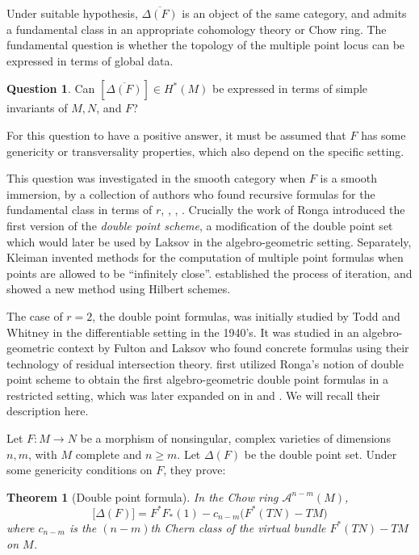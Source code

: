 \documentclass[11pt]{article}
\theoremstyle{plain}
\newtheorem{theorem}[fact]{Theorem}
\theoremstyle{definition}
\newtheorem*{question*}{Question}
\theoremstyle{definition}
\begin{document}
Under suitable hypothesis, $\overline{\Delta(F)}$ is an object of the same category, and admits a fundamental class in an appropriate cohomology theory or Chow ring. The fundamental question is whether the topology of the multiple point locus can be expressed in terms of global data.

\begin{question*}
    Can $\left[\overline{\Delta(F)}\right]\in H^*(M)$ be expressed in terms of simple invariants of $M,N$, and $F$? 
\end{question*}

For this question to have a positive answer, it must be assumed that $F$ has some genericity or transversality properties, which also depend on the specific setting. 

This question was investigated in the smooth category when $F$ is a smooth immersion, by a collection of authors who found recursive formulas for the fundamental class in terms of $r$, \cite{LS}, \cite{herbert}, \cite{Ronga1980}. Crucially the work of Ronga introduced the first version of the \textit{double point scheme}, a modification of the double point set which would later be used by Laksov in the algebro-geometric setting. Separately, Kleiman invented methods for the computation of multiple point formulas when points are allowed to be ``infinitely close''. \cite{Kleiman} established the process of iteration, and \cite{Kleiman-hilb} showed a new method using Hilbert schemes.

The case of $r=2$, the double point formulas, was initially studied by Todd and Whitney in the differentiable setting in the 1940's. It was studied in an algebro-geometric context by Fulton and Laksov who found concrete formulas using their technology of residual intersection theory. \cite{laksov} first utilized Ronga's notion of double point scheme to obtain the first algebro-geometric double point formulas in a restricted setting, which was later expanded on in \cite{fulton-laksov} and \cite{FultonIT}. We will recall their description here.

Let $F: M \to N$ be a morphism of nonsingular, complex varieties of dimensions $n,m$, with $M$ complete and $n\geq m$. Let $\Delta(F)$ be the double point set. Under some genericity conditions on $F$, they prove:

\begin{theorem}[Double point formula]
    In the Chow ring $\mathcal A^{n-m}(M)$,
    \[
    \big[\Delta(F)\big] = F^*F_*(1)- c_{n-m}\big(F^*(TN)-TM\big)
    \]
    where $c_{n-m}$ is the $(n-m)$th Chern class of the virtual bundle $F^*(TN)-TM$ on $M$. 
\end{theorem}
\end{document}
